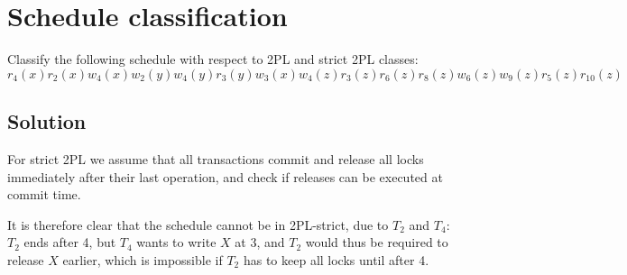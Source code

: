 \documentclass[12pt, a4paper]{report}
\begin{document}
    \newpage

    \section{Schedule classification}
        Classify the following schedule with respect to 2PL and strict 2PL classes: 
        \[r_4(x) r_2(x) w_4(x) w_2(y) w_4(y) r_3(y) w_3(x) w_4(z) r_3(z) r_6(z) r_8(z) w_6(z) w_9(z) r_5(z) r_10(z)\]
    \subsection*{Solution}
        For strict 2PL we assume that all transactions commit and release all locks immediately after their last operation, and check if releases can be executed at commit time.
        \begin{table}[H]
            \centering
        \end{table}
        It is therefore clear that the schedule cannot be in 2PL-strict, due to $T_2$ and $T_4$: $T_2$ ends after 4, but $T_4$ wants to write $X$ at 3, and $T_2$ would thus be 
        required to release $X$ earlier, which is impossible if $T_2$ has to keep all locks until after 4.
\end{document}
